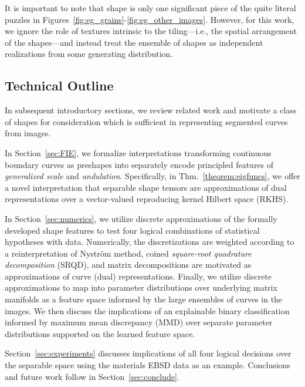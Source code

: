 \documentclass[pdflatex,iicol]{sn-jnl}%
\theoremstyle{thmstyleone}%
\theoremstyle{thmstyletwo}%
\theoremstyle{thmstylethree}%
\begin{document}
It is important to note that shape is only one significant piece of the quite literal puzzles in Figures~\ref{fig:eg_grains}-\ref{fig:eg_other_images}. However, for this work, we ignore the role of textures intrinsic to the tiling---i.e., the spatial arrangement of the shapes---and instead treat the ensemble of shapes as independent realizations from some generating distribution. %

\subsection{Technical Outline}
In subsequent introductory sections, we review related work and motivate a class of shapes for consideration which is sufficient in representing segmented curves from images.

In Section~\ref{sec:FIE}, we formalize interpretations transforming continuous boundary curves as preshapes into separately encode principled features of \textit{generalized scale} and \textit{undulation}. Specifically, in Thm.~\ref{theorem:eigfuncs}, we offer a novel interpretation that separable shape tensors are approximations of dual representations over a vector-valued reproducing kernel Hilbert space (RKHS). 

In Section~\ref{sec:numerics}, we utilize discrete approximations of the formally developed shape features to test four logical combinations of statistical hypotheses with data. Numerically, the discretizations are weighted according to a reinterpretation of Nystr\"om method, coined \textit{square-root quadrature decomposition} (SRQD), and matrix decompositions are motivated as approximations of curve (dual) representations. Finally, we utilize discrete approximations to map into parameter distributions over underlying matrix manifolds as a feature space informed by the large ensembles of curves in the images. We then discuss the implications of an explainable binary classification informed by maximum mean discrepancy (MMD) over separate parameter distributions supported on the learned feature space.

Section~\ref{sec:experiments} discusses implications of all four logical decisions over the separable space using the materials EBSD data as an example. Conclusions and future work follow in Section~\ref{sec:conclude}.
\end{document}
